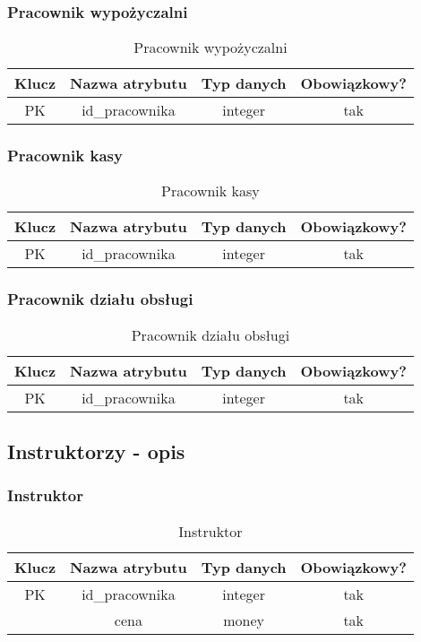 \subsubsection{Pracownik wypożyczalni}
\begin{table}[H]
	\centering
	\begin{tabular}{|c|c|c|c|}
		\hline
		Klucz & Nazwa atrybutu & Typ danych & Obowiązkowy? \\ \hline
		PK    & id\_pracownika & integer    & tak           \\ \hline
	\end{tabular}
	\caption{Pracownik wypożyczalni}
\end{table}

\subsubsection{Pracownik kasy}
\begin{table}[H]
	\centering
	\begin{tabular}{|c|c|c|c|}
		\hline
		Klucz & Nazwa atrybutu & Typ danych & Obowiązkowy? \\ \hline
		PK    & id\_pracownika & integer    & tak           \\ \hline
	\end{tabular}
	\caption{Pracownik kasy}
\end{table}

\subsubsection{Pracownik działu obsługi}
\begin{table}[H]
	\centering
	\begin{tabular}{|c|c|c|c|}
		\hline
		Klucz & Nazwa atrybutu & Typ danych & Obowiązkowy? \\ \hline
		PK    & id\_pracownika & integer    & tak           \\ \hline
	\end{tabular}
	\caption{Pracownik działu obsługi}
\end{table}

\subsection{Instruktorzy - opis}
\subsubsection{Instruktor}
\begin{table}[H]
	\centering
	\begin{tabular}{|c|c|c|c|}
		\hline
		Klucz & Nazwa atrybutu & Typ danych & Obowiązkowy? \\ \hline
		PK    & id\_pracownika & integer    & tak           \\ \hline
		      & cena           & money      & tak           \\ \hline
	\end{tabular}
	\caption{Instruktor}
\end{table}

